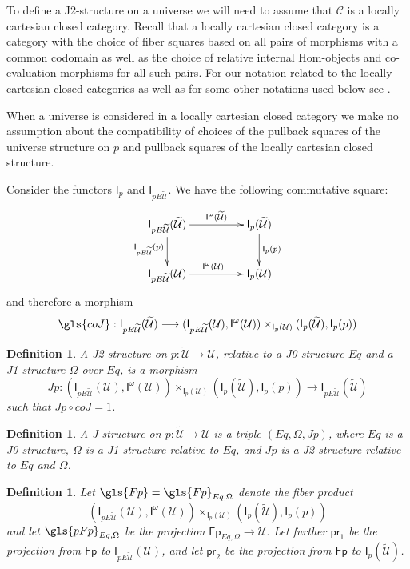 \documentclass[12pt]{article}
\numberwithin{equation}{section}
\newenvironment{eq}{\begin{equation}}{\end{equation}}
\newtheorem{definition}[proposition]{Definition}
\newcommand{\sr}{\rightarrow}
\newcommand{\lr}{\longrightarrow}
\newcommand{\wt}{\widetilde}
\newcommand{\C}{{\mathcal C}}  %
\newcommand{\id}{1}            %
\newcommand{\U}{\mathcal{U}}
\newcommand{\I}{\mathsf{I}}
\newcommand{\Fp}{\mathsf{Fp}}
\newcommand{\pr}{\mathsf{pr}}
\begin{document}
To define a J2-structure on a universe we will need to assume that $\C$
is a locally cartesian closed category.  Recall that a locally cartesian closed
category is a category with the choice of fiber squares based on all pairs of
morphisms with a common codomain as well as the choice of relative internal
Hom-objects and co-evaluation morphisms for all such pairs. For our notation
related to the locally cartesian closed categories as well as for some other
notations used below see \cite{fromunivwithPiI,presheavesOb,fromunivwithPiII}.

When a universe is considered in a locally cartesian closed category we make no
assumption about the compatibility of choices of the pullback squares of the
universe structure on $p$ and pullback squares of the locally cartesian closed
structure.

Consider the functors $\I_{p}$ and $\I_{pE\wt{\U}}$. We have the following
commutative square:
%
\begin{eq}\label{2010.sq1}
\begin{xy}
          \xymatrix@C=4pc{ \I_{pE\wt{\U}}(\wt{\U}) \ar[r]^-{\I^{\omega}(\wt{\U})}
            \ar[d]_{\I_{pE\wt{\U}}(p)} & \I_p(\wt{\U})
            \ar[d]^{\I_p(p)}\\ \I_{pE\wt{\U}}(\U) \ar[r]^{\I^{\omega}(\U)} & \I_p(\U) }
\end{xy}
\end{eq}%
%
and therefore a morphism
%
$$\gls{coJ} : \I_{pE\wt{\U}}(\wt{\U}) \lr (\I_{pE\wt{\U}}(\U), \I^{\omega}(\U))
\times_{\I_p(\U)} (\I_p(\wt{\U}), \I_p(p))
$$
%
\begin{definition}
\label{2015.03.27.def6} A {\em J2-structure} on $p:\wt{\U}\sr \U$, relative to a J0-structure $Eq$
and a J1-structure $\Omega$ over $Eq$, is a morphism
%
$$ Jp:( \I_{pE\wt{\U}}(\U), \I^{\omega}(\U))\times_{\I_p(\U)} (\I_p(\wt{\U}), \I_p(p))\sr
\I_{pE\wt{\U}}(\wt{\U}) $$
%
such that $Jp\circ coJ = \id$.
\end{definition}

\begin{definition}
  A J-structure on $p:\wt{\U}\sr \U$ is a triple $(Eq,\Omega,Jp)$, where $Eq$
  is a J0-structure, $\Omega$ is a J1-structure relative to $Eq$, and $Jp$ is a
  J2-structure relative to $Eq$ and $\Omega$.
\end{definition}

\begin{definition}
  \label{Fp-defn}
Let $\gls{Fp} = \gls{Fp}_{Eq,\Omega}$ denote the fiber product
%
$$(\I_{pE\wt{\U}}(\U), \I^{\omega}(\U)) \times_{\I_p(\U)} (\I_p(\wt{\U}), \I_p(p))$$
%
and let $\gls{pFp}_{Eq,\Omega}$ be the projection
$\Fp_{Eq,\Omega}\sr \U$. Let further $\pr_1$ be the projection from $\Fp$ to
$\I_{pE\wt{\U}}(\U)$, and let $\pr_2$ be the projection from $\Fp$ to $\I_p(\wt{\U})$.
\end{definition}
\end{document}
